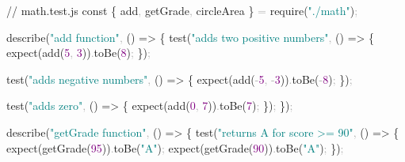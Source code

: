 \documentclass[
  justified,
  openright,
]{tufte-book}
\newcommand{\CommentTok}[1]{\textcolor{MidGray}{#1}}
\newcommand{\DecValTok}[1]{\textcolor{Purple}{#1}}
\newcommand{\FunctionTok}[1]{\textcolor{BrandBlue}{#1}}
\newcommand{\KeywordTok}[1]{\textcolor{BrandBlue}{#1}}
\newcommand{\NormalTok}[1]{#1}
\newcommand{\OperatorTok}[1]{\textcolor{DarkGray}{#1}}
\newcommand{\PreprocessorTok}[1]{\textcolor{BrandAccent}{#1}}
\newcommand{\StringTok}[1]{\textcolor{Teal}{#1}}
\newenvironment{Shaded}{%
  \begin{snugshade}
}{%
  \end{snugshade}
}
\begin{document}
\begin{Shaded}
\begin{Highlighting}[]
\CommentTok{// math.test.js}
\KeywordTok{const}\NormalTok{ \{ add}\OperatorTok{,}\NormalTok{ getGrade}\OperatorTok{,}\NormalTok{ circleArea \} }\OperatorTok{=} \PreprocessorTok{require}\NormalTok{(}\StringTok{"./math"}\NormalTok{)}\OperatorTok{;}

\FunctionTok{describe}\NormalTok{(}\StringTok{"add function"}\OperatorTok{,}\NormalTok{ () }\KeywordTok{=\textgreater{}}\NormalTok{ \{}
  \FunctionTok{test}\NormalTok{(}\StringTok{"adds two positive numbers"}\OperatorTok{,}\NormalTok{ () }\KeywordTok{=\textgreater{}}\NormalTok{ \{}
    \FunctionTok{expect}\NormalTok{(}\FunctionTok{add}\NormalTok{(}\DecValTok{5}\OperatorTok{,} \DecValTok{3}\NormalTok{))}\OperatorTok{.}\FunctionTok{toBe}\NormalTok{(}\DecValTok{8}\NormalTok{)}\OperatorTok{;}
\NormalTok{  \})}\OperatorTok{;}

  \FunctionTok{test}\NormalTok{(}\StringTok{"adds negative numbers"}\OperatorTok{,}\NormalTok{ () }\KeywordTok{=\textgreater{}}\NormalTok{ \{}
    \FunctionTok{expect}\NormalTok{(}\FunctionTok{add}\NormalTok{(}\OperatorTok{{-}}\DecValTok{5}\OperatorTok{,} \OperatorTok{{-}}\DecValTok{3}\NormalTok{))}\OperatorTok{.}\FunctionTok{toBe}\NormalTok{(}\OperatorTok{{-}}\DecValTok{8}\NormalTok{)}\OperatorTok{;}
\NormalTok{  \})}\OperatorTok{;}

  \FunctionTok{test}\NormalTok{(}\StringTok{"adds zero"}\OperatorTok{,}\NormalTok{ () }\KeywordTok{=\textgreater{}}\NormalTok{ \{}
    \FunctionTok{expect}\NormalTok{(}\FunctionTok{add}\NormalTok{(}\DecValTok{0}\OperatorTok{,} \DecValTok{7}\NormalTok{))}\OperatorTok{.}\FunctionTok{toBe}\NormalTok{(}\DecValTok{7}\NormalTok{)}\OperatorTok{;}
\NormalTok{  \})}\OperatorTok{;}
\NormalTok{\})}\OperatorTok{;}

\FunctionTok{describe}\NormalTok{(}\StringTok{"getGrade function"}\OperatorTok{,}\NormalTok{ () }\KeywordTok{=\textgreater{}}\NormalTok{ \{}
  \FunctionTok{test}\NormalTok{(}\StringTok{"returns A for score \textgreater{}= 90"}\OperatorTok{,}\NormalTok{ () }\KeywordTok{=\textgreater{}}\NormalTok{ \{}
    \FunctionTok{expect}\NormalTok{(}\FunctionTok{getGrade}\NormalTok{(}\DecValTok{95}\NormalTok{))}\OperatorTok{.}\FunctionTok{toBe}\NormalTok{(}\StringTok{"A"}\NormalTok{)}\OperatorTok{;}
    \FunctionTok{expect}\NormalTok{(}\FunctionTok{getGrade}\NormalTok{(}\DecValTok{90}\NormalTok{))}\OperatorTok{.}\FunctionTok{toBe}\NormalTok{(}\StringTok{"A"}\NormalTok{)}\OperatorTok{;}
\NormalTok{  \})}\OperatorTok{;}


\end{Highlighting}
\end{Shaded}
\end{document}
